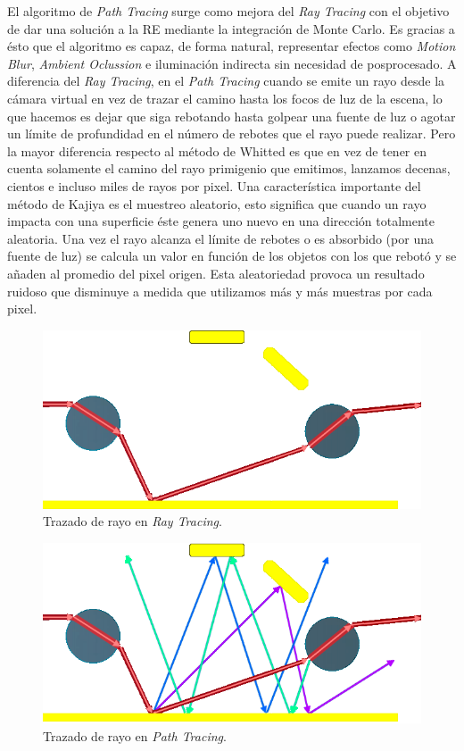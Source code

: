 \documentclass[titlepage,12pt]{article}
\begin{document}
El algoritmo de \textit{Path Tracing} surge como mejora del \textit{Ray Tracing} con el objetivo de dar una solución a la RE mediante la integración de Monte Carlo. Es gracias a ésto que el algoritmo es capaz, de forma natural, representar efectos como \textit{Motion Blur}, \textit{Ambient Oclussion} e iluminación indirecta sin necesidad de posprocesado. A diferencia del \textit{Ray Tracing}, en el \textit{Path Tracing} cuando se emite un rayo desde la cámara virtual en vez de trazar el camino hasta los focos de luz de la escena, lo que hacemos es dejar que siga rebotando hasta golpear una fuente de luz o agotar un límite de profundidad en el número de rebotes que el rayo puede realizar. Pero la mayor diferencia respecto al método de Whitted es que en vez de tener en cuenta solamente el camino del rayo primigenio que emitimos, lanzamos decenas, cientos e incluso miles de rayos por pixel. Una característica importante del método de Kajiya es el muestreo aleatorio, esto significa que cuando un rayo impacta con una superficie éste genera uno nuevo en una dirección totalmente aleatoria. Una vez el rayo alcanza el límite de rebotes o es absorbido (por una fuente de luz) se calcula un valor en función de los objetos con los que rebotó y se añaden al promedio del pixel origen. Esta aleatoriedad provoca un resultado ruidoso que disminuye a medida que utilizamos más y más muestras por cada pixel.

\begin{figure}[!ht]
	\centering
	\includegraphics[scale=0.45]{media/lightPathRT.png}
	\caption{Trazado de rayo en \textit{Ray Tracing}.}
	\label{RT_traced}
\end{figure}

\begin{figure}[!ht]
	\centering
	\includegraphics[scale=0.45]{media/lightPathPT.png}
	\caption{Trazado de rayo en \textit{Path Tracing}.}
	\label{PT_traced}
\end{figure}
\end{document}
